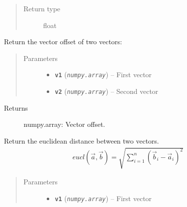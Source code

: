 \documentclass[letterpaper,10pt,english]{sphinxmanual}
\begin{document}
\begin{fulllineitems}
\begin{fulllineitems}
\begin{quote}
\begin{description}
\item[{Return type}] \leavevmode
float

\end{description}\end{quote}

\end{fulllineitems}


\begin{fulllineitems}
\label{src.mapping:src.mapping.mapthreading.MappingWorkerThread.distance}
Return the vector offset of two vectors:
\begin{quote}\begin{description}
\item[{Parameters}] \leavevmode\begin{itemize}
\item {} 
\textbf{\texttt{v1}} (\emph{\texttt{numpy.array}}) -- First vector

\item {} 
\textbf{\texttt{v2}} (\emph{\texttt{numpy.array}}) -- Second vector

\end{itemize}

\end{description}\end{quote}
\begin{description}
\item[{Returns}] \leavevmode
numpy.array: Vector offset.

\end{description}

\end{fulllineitems}


\begin{fulllineitems}
\label{src.mapping:src.mapping.mapthreading.MappingWorkerThread.euclidean_distance1}
Return the euclidean distance between two vectors.
\begin{equation*}
\begin{split}eucl(\vec{a}, \vec{b}) = \sqrt{\sum_{i=1}^n (\vec{b}_i - \vec{a}_i)^2}\end{split}
\end{equation*}\begin{quote}\begin{description}
\item[{Parameters}] \leavevmode\begin{itemize}
\item {} 
\textbf{\texttt{v1}} (\emph{\texttt{numpy.array}}) -- First vector


\end{itemize}
\end{description}
\end{quote}
\end{fulllineitems}
\end{fulllineitems}
\end{document}
